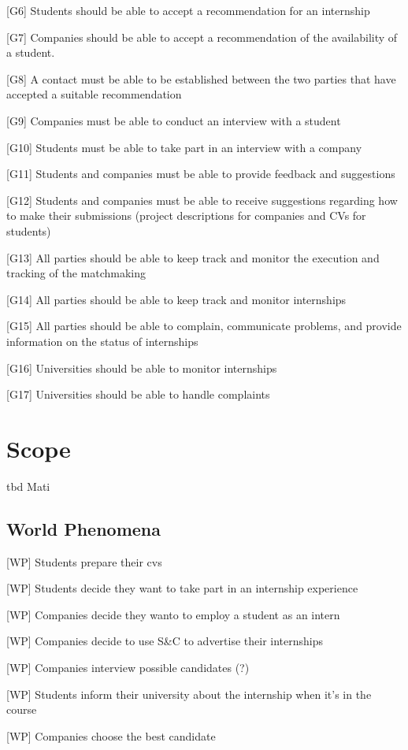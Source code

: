 [G6] Students should be able to accept a recommendation for an internship  

[G7] Companies should be able to accept a recommendation of the availability of a student. 

[G8] A contact must be able to be established between the two parties that have accepted a suitable recommendation  


[G9] Companies must be able to conduct an interview with a student 


[G10] Students must be able to take part in an interview with a company

[G11] Students and companies must be able to provide feedback and suggestions

[G12] Students and companies must be able to receive suggestions regarding how to make their submissions (project descriptions for companies and CVs for students)

[G13] All parties should be able to keep track and monitor the execution and tracking of the matchmaking

[G14] All parties should be able to keep track and monitor internships

[G15] All parties should be able to complain, communicate problems, and provide information on the status of internships

[G16] Universities should be able to monitor internships

[G17] Universities should be able to handle complaints



\section{Scope}
tbd Mati
\subsection{World Phenomena}
[WP] Students prepare their cvs

[WP] Students decide they want to take part in an internship experience

[WP] Companies decide they wanto to employ a student as an intern

[WP] Companies decide to use S\&C to advertise their internships

[WP] Companies interview possible candidates (?)

[WP] Students inform their university about the internship when it's in the course

[WP] Companies choose the best candidate

